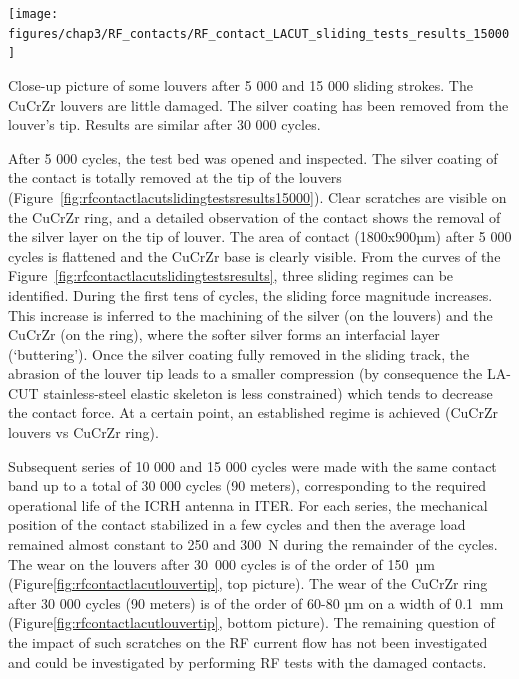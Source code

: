 {\begin{marginfigure}
	\centering
	\texttt{[image: figures/chap3/RF\_contacts/RF\_contact\_LACUT\_sliding\_tests\_results\_15000]}
	\caption{Close-up picture of some louvers after 5 000 and 15 000 sliding strokes. The CuCrZr louvers are little damaged. The silver coating has been removed from the louver's tip. Results are similar after 30 000 cycles.}
	\label{fig:rfcontactlacutslidingtestsresults15000}
\end{marginfigure}

After 5 000 cycles, the test bed was opened and inspected. The silver coating of the contact is totally removed at the tip of the louvers (Figure~\ref{fig:rfcontactlacutslidingtestsresults15000}). Clear scratches are visible on the CuCrZr ring, and a detailed observation of the contact shows the removal of the silver layer on the tip of louver. The area of contact (1800x900µm) after 5 000 cycles is flattened and the CuCrZr base is clearly visible. From the curves of the Figure~\ref{fig:rfcontactlacutslidingtestsresults}, three sliding regimes can be identified. During the first tens of cycles, the sliding force magnitude increases. This increase is inferred to the machining of the silver (on the louvers) and the CuCrZr (on the ring), where the softer silver forms an interfacial layer (‘buttering’). Once the silver coating fully removed in the sliding track, the abrasion of the louver tip leads to a smaller compression (by consequence the LA-CUT stainless-steel elastic skeleton is less constrained) which tends to decrease the contact force. At a certain point, an established regime is achieved (CuCrZr louvers vs CuCrZr ring).  

Subsequent series of 10 000 and 15 000 cycles were made with the same contact band up to a total of 30 000 cycles (90 meters), corresponding to the required operational life of the ICRH antenna in ITER. For each series, the mechanical position of the contact stabilized in a few cycles and then the average load remained almost constant to 250 and 300~N during the remainder of the cycles. The wear on the louvers after 30~000 cycles is of the order of 150~µm (Figure\ref{fig:rfcontactlacutlouvertip}, top picture). The wear of the CuCrZr ring after 30 000 cycles (90 meters) is of the order of 60-80 µm on a width of 0.1~mm (Figure\ref{fig:rfcontactlacutlouvertip}, bottom picture). The remaining question of the impact of such scratches on the RF current flow has not been investigated and could be investigated by performing RF tests with the damaged contacts.


}
